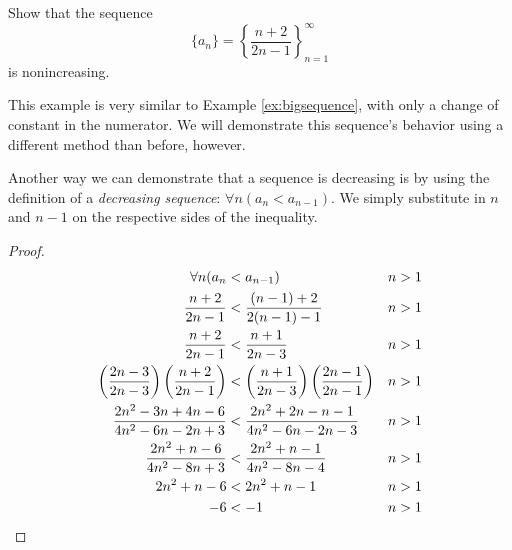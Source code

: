\begin{ex}
  Show that the sequence \[ \{a_n\} = \left\{ \frac{n+2}{2n-1} \right\}^{\infty}_{n=1} \] is nonincreasing.
  \begin{sol}
    This example is very similar to Example \ref{ex:bigsequence}, with only a
    change of constant in the numerator. We will demonstrate this sequence's
    behavior using a different method than before, however.

    Another way we can demonstrate that a sequence is decreasing is by using
    the definition of a \emph{decreasing sequence}: \(\forall n ( a_n <
    a_{n-1})\). We simply substitute in \(n\) and \(n-1\) on the
    respective sides of the inequality.
    \begin{proof}
      \begin{align*}
        \forall n (a_n &< a_{n-1}) &n&>1 \\
        \frac{n+2}{2n-1} &< \frac{(n-1)+2}{2(n-1)-1} &n&>1 \\
        \frac{n+2}{2n-1} &< \frac{n+1}{2n-3} &n&>1 \\
        \left(\frac{2n-3}{2n-3}\right) \left( \frac{n+2}{2n-1} \right)
        &< \left(\frac{n+1}{2n-3}\right) \left(\frac{2n-1}{2n-1}\right)
        &n&>1\\
        \frac{2n^2-3n+4n-6}{4n^2-6n-2n+3} &< \frac{2n^2+2n-n-1}{4n^2-6n-2n-3} &n&>1\\
        \frac{2n^2+n-6}{4n^2-8n+3}&<\frac{2n^2+n-1}{4n^2-8n-4} &n&>1 \\
        2n^2+n-6 &< 2n^2+n-1 &n&>1 \\
        -6 &< -1 &n&>1 \qedhere
      \end{align*}
    \end{proof}
  \end{sol}
\end{ex}
